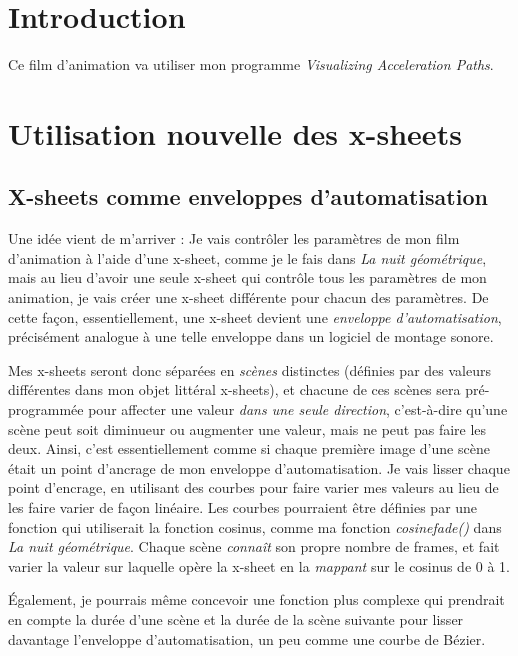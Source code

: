 
\section{Introduction}
Ce film d'animation va utiliser mon programme \textit{Visualizing Acceleration Paths}.

\section{Utilisation nouvelle des x-sheets}

\subsection{X-sheets comme enveloppes d'automatisation}
Une idée vient de m'arriver : Je vais contrôler les paramètres de mon film d'animation à l'aide d'une x-sheet, comme je le fais dans \textit{La nuit géométrique}, mais au lieu d'avoir une seule x-sheet qui contrôle tous les paramètres de mon animation, je vais créer une x-sheet différente pour chacun des paramètres. De cette façon, essentiellement, une x-sheet devient une \textit{enveloppe d'automatisation}, précisément analogue à une telle enveloppe dans un logiciel de montage sonore.

Mes x-sheets seront donc séparées en \textit{scènes} distinctes (définies par des valeurs différentes dans mon objet littéral x-sheets), et chacune de ces scènes sera pré-programmée pour affecter une valeur \textit{dans une seule direction}, c'est-à-dire qu'une scène peut soit diminueur ou augmenter une valeur, mais ne peut pas faire les deux. Ainsi, c'est essentiellement comme si chaque première image d'une scène était un point d'ancrage de mon enveloppe d'automatisation. Je vais lisser chaque point d'encrage, en utilisant des courbes pour faire varier mes valeurs au lieu de les faire varier de façon linéaire. Les courbes pourraient être définies par une fonction qui utiliserait la fonction cosinus, comme ma fonction \textit{cosinefade()} dans \textit{La nuit géométrique}. Chaque scène \textit{connaît} son propre nombre de frames, et fait varier la valeur sur laquelle opère la x-sheet en la \textit{mappant} sur le cosinus de 0 à 1.

Également, je pourrais même concevoir une fonction plus complexe qui prendrait en compte la durée d'une scène et la durée de la scène suivante pour lisser davantage l'enveloppe d'automatisation, un peu comme une courbe de Bézier.

